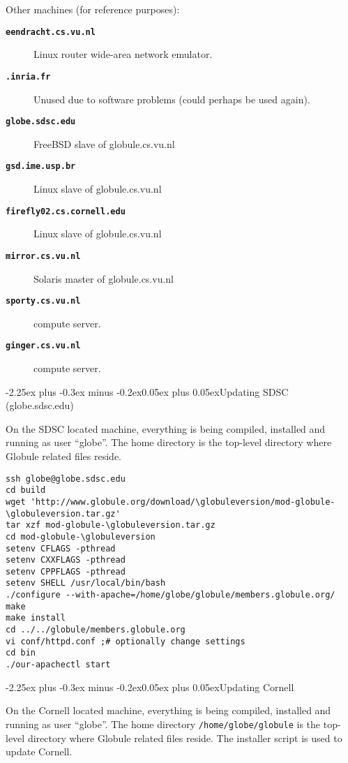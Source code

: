 \documentclass[10pt,twoside]{article}
\makeatletter
\def\subsubsection{\@startsection{subsubsection}{3}
{\z@}{-2.25ex plus -0.3ex minus -0.2ex}{0.05ex plus 0.05ex}{\normalsize\sc}}
\makeatother
\begin{document}
Other machines (for reference purposes):
\begin{description}
\item[\bf\tt eendracht.cs.vu.nl] Linux router wide-area network emulator.
\item[\bf\tt *.inria.fr] Unused due to software problems (could perhaps be used again).
\item[\bf\tt globe.sdsc.edu] FreeBSD slave of globule.cs.vu.nl
\item[\bf\tt gsd.ime.usp.br] Linux slave of globule.cs.vu.nl
\item[\bf\tt firefly02.cs.cornell.edu] Linux slave of globule.cs.vu.nl
\item[\bf\tt mirror.cs.vu.nl] Solaris master of globule.cs.vu.nl
\item[\bf\tt sporty.cs.vu.nl] compute server.
\item[\bf\tt ginger.cs.vu.nl] compute server.
\end{description}

\newpage

\subsubsection{Updating SDSC (globe.sdsc.edu)}

On the SDSC located machine, everything is being compiled, installed and
running as user ``globe''.  The home directory \verb!! is the top-level
directory where Globule related files reside.

\begin{verbatim}
ssh globe@globe.sdsc.edu
cd build
wget 'http://www.globule.org/download/\globuleversion/mod-globule-\globuleversion.tar.gz'
tar xzf mod-globule-\globuleversion.tar.gz
cd mod-globule-\globuleversion
setenv CFLAGS -pthread
setenv CXXFLAGS -pthread
setenv CPPFLAGS -pthread
setenv SHELL /usr/local/bin/bash
./configure --with-apache=/home/globe/globule/members.globule.org/
make
make install
cd ../../globule/members.globule.org
vi conf/httpd.conf ;# optionally change settings
cd bin
./our-apachectl start
\end{verbatim}

\subsubsection{Updating Cornell}

On the Cornell located machine, everything is being compiled, installed and
running as user ``globe''.  The home directory \verb!/home/globe/globule!
is the top-level directory where Globule related files reside.  The installer
script is used to update Cornell.
\end{document}
